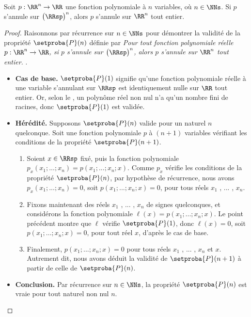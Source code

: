 

\begin{fact} \label{poly-nullity-pos}
	Soit $p: \RR^n \rightarrow \RR$ une fonction polynomiale à $n$ variables, où $n \in \NNs$.
	Si $p$ s'annule sur $\big( \RRsp \big)^n$, alors $p$ s'annule sur $\RR^n$ tout entier. 
\end{fact}


\begin{proof}
	Raisonnons par récurrence sur $n \in \NNs$ pour démontrer la validité de la propriété $\setproba{P}(n)$ définie par
	\emph{\og 
		Pour tout fonction polynomiale réelle $p: \RR^n \rightarrow \RR$,
		si $p$ s'annule sur $\big( \RRsp \big)^n$,
		alors $p$ s'annule sur $\RR^n$ tout entier. 
	\fg}\kern2pt.
	\begin{itemize}[label=\small\textbullet]
		\item \textbf{Cas de base.}
		$\setproba{P}(1)$ signifie qu'une fonction polynomiale réelle à une variable s'annulant sur $\RRsp$ est identiquement nulle sur $\RR$ tout entier.
		Or, selon le , un polynôme réel non nul n'a qu'un nombre fini de racines, donc $\setproba{P}(1)$ est validée.


		\item \textbf{Hérédité.}
		Supposons $\setproba{P}(n)$ valide pour un naturel $n$ quelconque.
		Soit une fonction polynomiale $p$ à $(n + 1)$ variables vérifiant les conditions de la propriété $\setproba{P}(n + 1)$.
		\begin{enumerate}
		    \item Soient $x \in \RRsp$ fixé, puis la fonction polynomiale $p_x(x_1 ; ... ; x_n) = p(x_1 ; ... ; x_n ; x)$.
		    Comme $p_x$ vérifie les conditions de la propriété $\setproba{P}(n)$, par hypothèse de récurrence, nous avons
		    $p_x(x_1 ; ... ; x_n) = 0$, soit $p(x_1 ; ... ; x_n ; x) = 0$, pour tous réels $x_1$ , ... , $x_n$.


		    \item Fixons maintenant des réels $x_1$ , ... , $x_n$ de signes quelconques, et considérons la fonction polynomiale $\ell(x) = p(x_1 ; ... ; x_n ; x)$.
		    Le point précédent montre que $\ell$ vérifie $\setproba{P}(1)$, donc $\ell(x) = 0$, soit $p(x_1 ; ... ; x_n ; x) = 0$, pour tout réel $x$, d'après le cas de base.


		    \item Finalement, $p(x_1 ; ... ; x_n ; x) = 0$ pour tous réels $x_1$ , ... , $x_n$ et $x$.
		    Autrement dit, nous avons déduit la validité de $\setproba{P}(n+1)$ à partir de celle de $\setproba{P}(n)$.
		\end{enumerate}
		
		
		\item \textbf{Conclusion.}
		Par récurrence sur $n \in \NNs$, la propriété $\setproba{P}(n)$ est vraie pour tout naturel non nul $n$.
	\end{itemize}

	\null\vspace{-6ex}
\end{proof}


